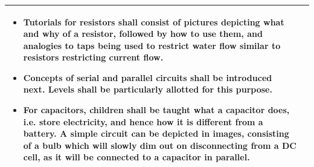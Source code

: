 \documentclass[preprint,12pt]{elsarticle}
\begin{document}
\begin{center}
\begin{tabularx}{\linewidth}{|l|X|}
{\begin{itemize}[noitemsep, topsep=2pt]
	\begin{itemize}[noitemsep, topsep=2pt]
		\item Tutorials for resistors shall consist of pictures depicting what and why of a resistor, followed by how to use them, and analogies to taps being used to restrict water flow similar to resistors restricting current flow.
		
		\item Concepts of serial and parallel circuits shall be introduced next. Levels shall be particularly allotted for this purpose.
		
		\item For capacitors, children shall be taught what a capacitor does, i.e. store electricity, and hence how it is different from  a battery. A simple circuit can be depicted in images, consisting of a bulb which will slowly dim out on disconnecting from a DC cell, as it will be connected to a capacitor in parallel.
		
	\end{itemize}
\end{itemize}
}\\
\hline



\end{tabularx}
\end{center}
\end{document}
